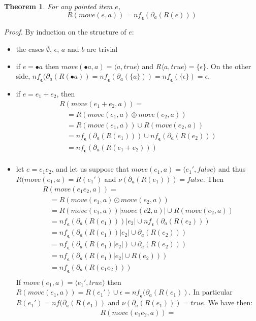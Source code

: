 \documentclass[preprint]{sigplanconf}
\newcommand{\true}{\mathit{true}}
\newcommand{\false}{\mathit{false}}
\newcommand{\der}[2]{\ensuremath{\partial_{#1}(#2)}}
\newcommand{\nul}[1]{\ensuremath{\nu(#1)}}
\newcommand{\dnf}{\mathit{nf}}
\newcommand{\nf}{\mathit{nf}_{\!\mathbf{\epsilon}}}
\newcounter{item}
\newtheorem{theorem}[item]{Theorem}
\newenvironment{proof}{\begin{trivlist}\item[]{\em Proof.}}{\end{trivlist}}
\begin{document}
\begin{theorem}\label{techy}For any pointed item $e$,
  \[R(move(e,a)) = \nf(\der{a}{R(e)})\]
\end{theorem}
\begin{proof}
By induction on the structure of $e$:
\begin{itemize}
\item the cases $\emptyset$, $\epsilon$, $a$ and $b$ are trivial
\item if $e=\bullet a$ then $move(\bullet a,a) = \langle a,true \rangle$
and  $R\langle a,true \rangle = \{\epsilon\}$. On the other side, 
$\nf(\der{a}{R(\bullet a)} = \nf(\der{a}{\{a\}}) = \nf(\{\epsilon\}) = {\epsilon}$.
\item if $e=e_1+e_2$, then
\[
\begin{array}{l}
R(move(e_1+e_2,a)) =\\
\quad= R(move(e_1,a) \oplus move(e_2,a))\\
\quad= R(move(e_1,a)) \cup R(move(e_2,a))\\
\quad= \nf(\der{a}{R(e_1)}) \cup \nf(\der{a}{R(e_2)})\\
\quad= \nf(\der{a}{R(e_1+e_2)})\\
\end{array}
\]
\item let $e=e_1e_2$, and let us suppose that $move(e_1,a) =
\langle e_1', \false \rangle$ and thus $R(move(e_1,a) = R(e_1')$
and $\nul{\der{a}{R(e_1)}} = \false$. Then
\[
\begin{array}{l}
R(move(e_1e_2,a)) =\\
\quad= R(move(e_1,a) \odot move(e_2,a))\\
\quad= R(move(e_1,a))|move(e2,a)| \cup R(move(e_2,a))\\
\quad= \nf(\der{a}{R(e_1)})|e_2| \cup \nf(\der{a}{R(e_2)})\\
\quad= \nf(\der{a}{R(e_1)}|e_2| \cup \der{a}{R(e_2)})\\
\quad= \nf(\der{a}{R(e_1)|e_2|} \cup \der{a}{R(e_2)})\\
\quad= \nf(\der{a}{R(e_1)|e_2| \cup R(e_2)})\\
\quad= \nf(\der{a}{R(e_1e_2)})\\
\end{array}
\]
If $move(e_1,a) = \langle e_1', \true \rangle$ then
$R(move(e_1,a)) = R(e_1') \cup {\epsilon} = \nf(\der{a}{R(e_1)}$. In particular
$R(e_1') = \dnf(\der{a}{R(e_1)}$ and $\nul{\der{a}{R(e_1)}} = \true$.
We have then:
\[
\begin{array}{l}
R(move(e_1e_2,a)) =\\

\end{array}\]
\end{itemize}
\end{proof}
\end{document}
